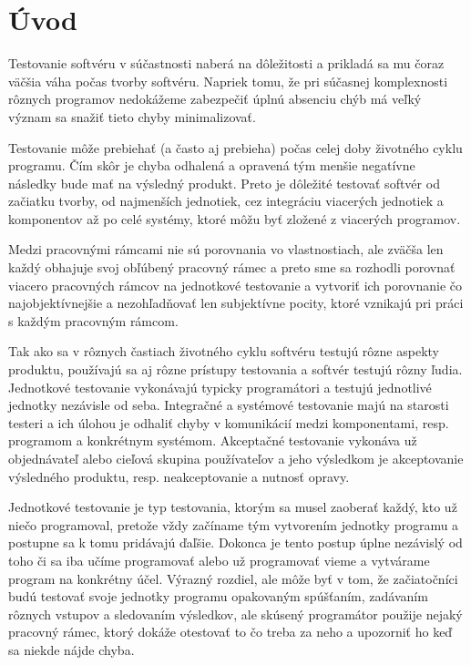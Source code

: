\documentclass[11pt,twoside,slovak,a4paper]{article}
\begin{document}
	\begin{titlepage}
		\tableofcontents
	\end{titlepage}
	
	
	\pagestyle{fancy}
	\fancyhf{}
	\fancyhead[RE,RO]{\thechapter \leftmark}
	\fancyfoot[CE,CO]{\thepage}
	\headheight 14pt
	\setcounter{page}{1}
	
	\thispagestyle{plain}
	\section{Úvod}
	Testovanie softvéru v súčastnosti naberá na dôležitosti a prikladá sa mu čoraz väčšia váha počas tvorby softvéru. Napriek tomu, že pri súčasnej komplexnosti rôznych programov nedokážeme zabezpečiť úplnú absenciu chýb má veľký význam sa snažiť tieto chyby minimalizovať.
	
	Testovanie môže prebiehať (a často aj prebieha) počas celej doby životného cyklu programu. Čím skôr je chyba odhalená a opravená tým menšie negatívne následky bude mať na výsledný produkt. Preto je dôležité testovať softvér od začiatku tvorby, od najmenších jednotiek, cez integráciu viacerých jednotiek a komponentov až po celé systémy, ktoré môžu byť zložené z viacerých programov.
	
	Medzi pracovnými rámcami nie sú porovnania vo vlastnostiach, ale zväčša len každý obhajuje svoj obľúbený pracovný rámec a preto sme sa rozhodli porovnať viacero pracovných rámcov na jednotkové testovanie a vytvoriť ich porovnanie čo najobjektívnejšie a nezohľadňovať len subjektívne pocity, ktoré vznikajú pri práci s každým pracovným rámcom.
		
	Tak ako sa v rôznych častiach životného cyklu softvéru testujú rôzne aspekty produktu, používajú sa aj rôzne prístupy testovania a softvér testujú rôzny ľudia. Jednotkové testovanie vykonávajú typicky programátori a testujú jednotlivé jednotky nezávisle od seba. Integračné a systémové testovanie majú na starosti testeri a ich úlohou je odhaliť chyby v komunikácií medzi komponentami, resp. programom a konkrétnym systémom. Akceptačné testovanie vykonáva už objednávateľ alebo cieľová skupina používateľov a jeho výsledkom je akceptovanie výsledného produktu, resp. neakceptovanie a nutnosť opravy\cite{Myers}.
	
	Jednotkové testovanie je typ testovania, ktorým sa musel zaoberať každý, kto už niečo programoval, pretože vždy začíname tým  vytvorením jednotky programu a postupne sa k tomu pridávajú ďaľšie. Dokonca je tento postup úplne nezávislý od toho či sa iba učíme programovať alebo už programovať vieme a vytvárame program na konkrétny účel. Výrazný rozdiel, ale môže byť v tom, že začiatočníci budú testovať svoje jednotky programu opakovaným spúšťaním, zadávaním rôznych vstupov a sledovaním výsledkov, ale skúsený programátor použije nejaký pracovný rámec, ktorý dokáže otestovať to čo treba za neho a upozorniť ho keď sa niekde nájde chyba.
	
\end{document}
